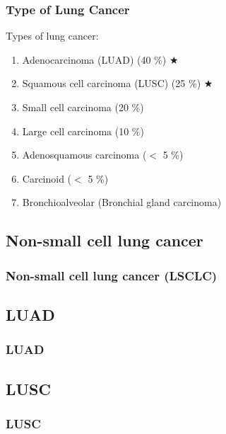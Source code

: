 \documentclass{beamer}
\begin{document}
    \begin{frame}
        \frametitle{Type of Lung Cancer}

        Types of lung cancer:
        \begin{enumerate}
            \item Adenocarcinoma (LUAD) (40 \%) $\bigstar$
            \item Squamous cell carcinoma (LUSC) (25 \%) $\bigstar$
            \item Small cell carcinoma (20 \%)
            \item Large cell carcinoma (10 \%)
            \item Adenosquamous carcinoma ($<$ 5 \%)
            \item Carcinoid ($<$ 5 \%)
            \item Bronchioalveolar (Bronchial gland carcinoma)
        \end{enumerate}
        \cite{lung1, lung2}
    \end{frame}

    \subsection{Non-small cell lung cancer}
    \begin{frame}
        \frametitle{Non-small cell lung cancer (LSCLC)}
    \end{frame}

    \subsection{LUAD}
    \begin{frame}
        \frametitle{LUAD}
    \end{frame}

    \subsection{LUSC}
    \begin{frame}
        \frametitle{LUSC}
    \end{frame}
\end{document}

